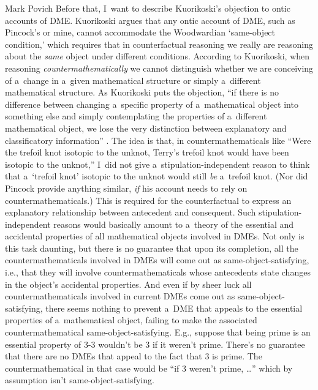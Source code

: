 \begin{artengenv}{Mark Povich}
Before that, I~want to describe Kuorikoski's
\parencite*[][]{kuorikoski_there_2021} %
 objection to ontic accounts of DME. Kuorikoski argues that any ontic account of DME, such as Pincock's or mine, cannot accommodate the Woodwardian ‘same-object condition,' which requires that in counterfactual reasoning we really are reasoning about the \textit{same} object under different conditions. According to Kuorikoski, when reasoning \textit{countermathematically} we cannot distinguish whether we are conceiving of a~change in a~given mathematical structure or simply a~different mathematical structure. As Kuorikoski puts the objection, ``if there is no difference between changing a~specific property of a~mathematical object into something else and simply contemplating the properties of a~different mathematical object, we lose the very distinction between explanatory and classificatory information'' 
\parencite[][p.197]{kuorikoski_there_2021}. %
 The idea is that, in countermathematicals like ``Were the trefoil knot isotopic to the unknot, Terry's trefoil knot would have been isotopic to the unknot,'' I~did not give a~stipulation-independent reason to think that a~‘trefoil knot' isotopic to the unknot would still \textit{be} a~trefoil knot. (Nor did Pincock provide anything similar, \textit{if} his account needs to rely on countermathematicals.) This is required for the counterfactual to express an explanatory relationship between antecedent and consequent. Such stipulation-independent reasons would basically amount to a~theory of the essential and accidental properties of all mathematical objects involved in DMEs. Not only is this task daunting, but there is no guarantee that upon its completion, all the countermathematicals involved in DMEs will come out as same-object-satisfying, i.e., that they will involve countermathematicals whose antecedents state changes in the object's accidental properties. And even if by sheer luck all countermathematicals involved in current DMEs come out as same-object-satisfying, there seems nothing to prevent a~DME that appeals to the essential properties of a~mathematical object, failing to make the associated countermathematical same-object-satisfying. E.g., suppose that being prime is an essential property of 3-3 wouldn't be 3 if it weren't prime. There's no guarantee that there are no DMEs that appeal to the fact that 3 is prime. The countermathematical in that case would be ``if 3 weren't prime, …'' which by assumption isn't same-object-satisfying.


\end{artengenv}
